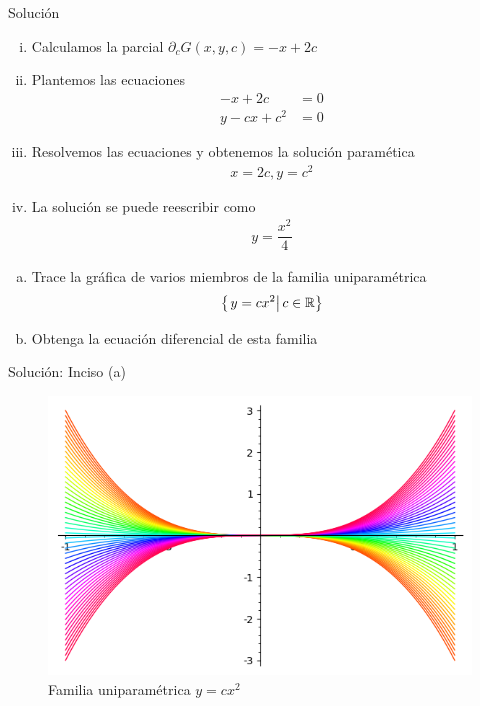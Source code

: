 {Solución}
\begin{enumerate}[(i)]
  \item Calculamos la parcial $
   \partial_{c}G(x,y,c) =-x+2c$
 
 \item Plantemos las ecuaciones
   \begin{align}
  -x+2c&=0\\
  y-cx+c^2&=0
  \end{align}
  
  \item Resolvemos las ecuaciones y obtenemos la solución paramética
     \begin{align}
   x=2c, y =c^{2}
   \end{align}
   
   \item La solución se puede reescribir como
       \begin{align}
    y = \dfrac{x^2}{4}
    \end{align}
\end{enumerate}


{}
  \begin{problema}
   \begin{enumerate}[(a)]
     \item Trace la gráfica de varios miembros de la familia uniparamétrica $$\left\{ \left.y=cx^2 \right| c\in \mathbb{R} \right\}$$ 
     \item Obtenga la ecuación diferencial de esta familia
\end{enumerate}
  \end{problema}


{Solución: Inciso (a)}
  \begin{figure}
 \centering
 \includegraphics[height=.5\textheight,keepaspectratio=true]{./edo/solved_problem_02-06.png}
 \caption{Familia uniparamétrica $y=cx^2$}
 \label{fig:solved0206}
\end{figure}


